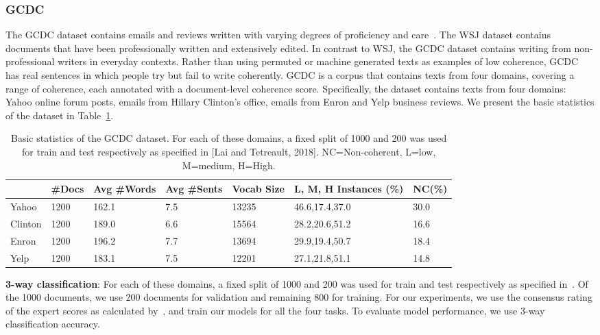 \documentclass[11pt]{article}
\begin{document}
\subsubsection{GCDC}
The GCDC dataset contains emails and reviews written with varying degrees of proficiency and care~\cite{lai2018discourse}. The WSJ dataset contains documents that have been professionally written and extensively edited. In contrast to WSJ, the GCDC dataset contains writing from non-professional writers in everyday contexts. Rather than using permuted or machine generated texts as examples of low coherence, GCDC has real sentences in which people try but fail to write coherently. GCDC is a corpus that contains texts from four domains, covering a range of coherence, each annotated with a document-level coherence score. Specifically, the dataset contains texts from four domains: Yahoo online forum posts, emails from Hillary Clinton's office, emails from Enron and Yelp business reviews.  We present the basic statistics of the dataset in Table~\ref{tab:gcdcStats}.

\begin{table}
    \centering
    \scriptsize
    \begin{tabular}{|l|l|p{0.3in}|p{0.3in}|p{0.3in}|p{0.6in}|l|}
\hline
&\#Docs&Avg \#Words&Avg \#Sents&Vocab Size&L, M, H Instances (\%)&NC(\%)\\
\hline
Yahoo&1200&162.1&7.5&13235&46.6,17.4,37.0&30.0\\
\hline
Clinton&1200&189.0&6.6&15564&28.2,20.6,51.2&16.6\\
\hline
Enron&1200&196.2&7.7&13694&29.9,19.4,50.7&18.4\\
\hline
Yelp&1200&183.1&7.5&12201&27.1,21.8,51.1&14.8\\
\hline
    \end{tabular}
    \caption{Basic statistics of the GCDC dataset. For each of these domains, a fixed split of 1000 and 200 was used for train and test respectively as specified in [Lai and Tetreault, 2018]. NC=Non-coherent, L=low, M=medium, H=High.}
    \label{tab:gcdcStats}
\end{table}

\noindent\textbf{3-way classification}: For each of these domains, a fixed split of 1000 and 200 was used for train and test respectively as specified in~\cite{lai2018discourse}. Of the 1000 documents, we use 200 documents for validation and remaining 800 for training. For our experiments, we use the consensus rating of the expert scores as calculated by~\cite{lai2018discourse}, and train our models for all the four tasks. To evaluate model performance, we use 3-way classification accuracy.
\end{document}
